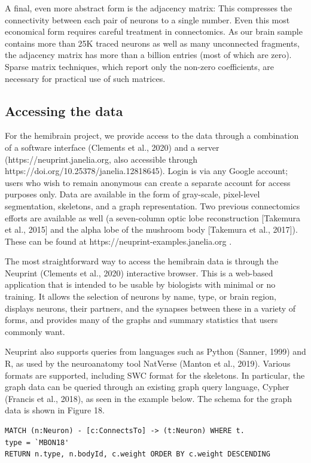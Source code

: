 \documentclass{article}
\begin{document}
A final, even more abstract form is the adjacency matrix: This compresses the connectivity between each pair of neurons to a single number. Even this most economical form requires careful treatment in connectomics. As our brain sample contains more than 25K traced neurons as well as many unconnected fragments, the adjacency matrix has more than a billion entries (most of which are zero). Sparse matrix techniques, which report only the non-zero coefficients, are necessary for practical use of such matrices.

\subsection*{Accessing the data}

For the hemibrain project, we provide access to the data through a combination of a software interface (Clements et al., 2020) and a server (https://neuprint.janelia.org, also accessible through https://doi.org/10.25378/janelia.12818645). Login is via any Google account; users who wish to remain anonymous can create a separate account for access purposes only. Data are available in the form of gray-scale, pixel-level segmentation, skeletons, and a graph representation. Two previous connectomics efforts are available as well (a seven-column optic lobe reconstruction [Takemura et al., 2015] and the alpha lobe of the mushroom body [Takemura et al., 2017]). These can be found at https://neuprint-examples.janelia.org .

The most straightforward way to access the hemibrain data is through the Neuprint (Clements et al., 2020) interactive browser. This is a web-based application that is intended to be usable by biologists with minimal or no training. It allows the selection of neurons by name, type, or brain region, displays neurons, their partners, and the synapses between these in a variety of forms, and provides many of the graphs and summary statistics that users commonly want.

Neuprint also supports queries from languages such as Python (Sanner, 1999) and R, as used by the neuroanatomy tool NatVerse (Manton et al., 2019). Various formats are supported, including SWC format for the skeletons. In particular, the graph data can be queried through an existing graph query language, Cypher (Francis et al., 2018), as seen in the example below. The schema for the graph data is shown in Figure 18.

\begin{verbatim}
MATCH (n:Neuron) - [c:ConnectsTo] -> (t:Neuron) WHERE t.
type = `MBON18'
RETURN n.type, n.bodyId, c.weight ORDER BY c.weight DESCENDING
\end{verbatim}
\end{document}
